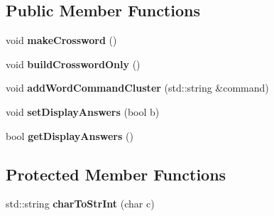 \subsection*{Public Member Functions}
\begin{DoxyCompactItemize}
\item 
void {\bfseries make\+Crossword} ()\hypertarget{classCrosswordWorksheet_ae71879c8a073e2582b1382f4d658cd60}{}\label{classCrosswordWorksheet_ae71879c8a073e2582b1382f4d658cd60}

\item 
void {\bfseries build\+Crossword\+Only} ()\hypertarget{classCrosswordWorksheet_a9be04af32644784bf72f3d055ceed5ac}{}\label{classCrosswordWorksheet_a9be04af32644784bf72f3d055ceed5ac}

\item 
void {\bfseries add\+Word\+Command\+Cluster} (std\+::string \&command)\hypertarget{classCrosswordWorksheet_affc342f3129caf2552beb6424f88ef9c}{}\label{classCrosswordWorksheet_affc342f3129caf2552beb6424f88ef9c}

\item 
void {\bfseries set\+Display\+Answers} (bool b)\hypertarget{classCrosswordWorksheet_a82e203edd8ddf4a3c5d820ae720ab614}{}\label{classCrosswordWorksheet_a82e203edd8ddf4a3c5d820ae720ab614}

\item 
bool {\bfseries get\+Display\+Answers} ()\hypertarget{classCrosswordWorksheet_ab6cf981c6dd95beeae33a37ea3871c51}{}\label{classCrosswordWorksheet_ab6cf981c6dd95beeae33a37ea3871c51}

\end{DoxyCompactItemize}
\subsection*{Protected Member Functions}
\begin{DoxyCompactItemize}
\item 
std\+::string {\bfseries char\+To\+Str\+Int} (char c)\hypertarget{classCrosswordWorksheet_aeb7b7acc71821fb7e2fd2edc259dbf95}{}\label{classCrosswordWorksheet_aeb7b7acc71821fb7e2fd2edc259dbf95}

\end{DoxyCompactItemize}
